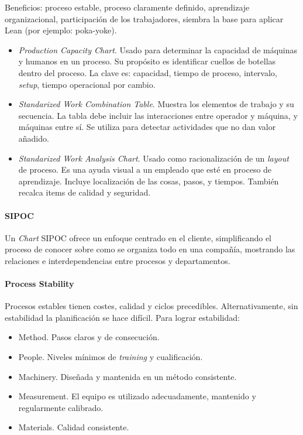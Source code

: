 \documentclass[]{article}
\begin{document}
Beneficios: proceso estable, proceso claramente definido, aprendizaje organizacional, participación de los trabajadores, siembra la base para aplicar Lean (por ejemplo: poka-yoke).

\begin{itemize}
	\item \textit{Production Capacity Chart}. Usado para determinar la capacidad de máquinas y humanos en un proceso. Su propósito es identificar cuellos de botellas dentro del proceso. La clave es: capacidad, tiempo de proceso, intervalo, \textit{setup}, tiempo operacional por cambio.
	\item \textit{Standarized Work Combination Table}. Muestra los elementos de trabajo y su secuencia. La tabla debe incluir las interacciones entre operador y máquina, y máquinas entre sí. Se utiliza para detectar actividades que no dan valor añadido.
	\item \textit{Standarized Work Analysis Chart}. Usado como racionalización de un \textit{layout} de proceso. Es una ayuda visual a un empleado que esté en proceso de aprendizaje. Incluye localización de las cosas, pasos, y tiempos. También recalca items de calidad y seguridad.
\end{itemize}

\paragraph{SIPOC}

Un \textit{Chart} SIPOC ofrece un enfoque centrado en el cliente, simplificando el proceso de conocer sobre como se organiza todo en una compañía, mostrando las relaciones e interdependencias entre procesos y departamentos.

\paragraph{Process Stability}
Procesos estables tienen costes, calidad y ciclos precedibles. Alternativamente, sin estabilidad la planificación se hace difícil. Para lograr estabilidad:
\begin{itemize}
	\item Method. Pasos claros y de consecución.
	\item People. Niveles mínimos de \textit{training} y cualificación.
	\item Machinery. Diseñada y mantenida en un método consistente.
	\item Measurement. El equipo es utilizado adecuadamente, mantenido y regularmente calibrado.
	\item Materials. Calidad consistente.
\end{itemize}
\end{document}

